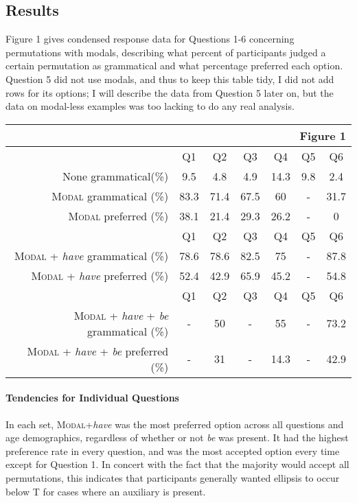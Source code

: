 \documentclass[11pt, oneside]{article}
\begin{document}
\subsection{Results}\label{Rslt}

Figure 1 gives condensed response data for Questions 1-6 concerning permutations with modals, describing what percent of participants judged a certain permutation as grammatical and what percentage preferred each option.  Question 5 did not use modals, and thus to keep this table tidy, I did not add rows for its options; I will describe the data from Question 5 later on, but the data on modal-less examples was too lacking to do any real analysis.
\small
\begin{center}
\begin{tabular}{|r|c|c|c|c|c|c|}
\multicolumn{7}{r}{Figure 1}\\
\hline\rowcolor{gblu}
	&Q1
 	&Q2
	&Q3
	&Q4
	&Q5
	&Q6\\
\hline
\hline
\rowcolor{lgr}None grammatical\footnotemark (\%) 
	&9.5 
	&4.8 
	&4.9 
	&14.3 
	&9.8
	&2.4\\
\hline\hline
\textsc{Modal} grammatical (\%) 
	&83.3
	&71.4
	&67.5
	&60
	&-
	&31.7  \\
\hline
\rowcolor{lgr}\textsc{Modal} preferred (\%)
	&38.1
	&21.4
	&29.3
	&26.2
	&-
	&0   \\
\hline\hline\rowcolor{gblu}
	&Q1
	&Q2
	&Q3
	&Q4
	&Q5
	&Q6\\
\hline\hline
\rowcolor{lgr}\textsc{Modal} + \textit{have} grammatical (\%)
	&78.6
	&78.6
	&82.5&
	75
	&-
	&87.8\\
\hline
\textsc{Modal} + \textit{have} preferred (\%)
	&52.4
	&42.9
	&65.9
	&45.2
	&-
	&54.8 \\
\hline\hline\rowcolor{gblu}
	&Q1
	&Q2
	&Q3
	&Q4
	&Q5
	&Q6\\
\hline\hline
\rowcolor{lgr}\textsc{Modal} + \textit{have} + \textit{be} grammatical (\%)
	&-
	&50
	&- 
	&55
	&- 
	&73.2\\
\hline
\textsc{Modal} + \textit{have} + \textit{be} preferred (\%) 
	&- 
	&31
	&-
	&14.3
	&-
	&42.9  \\
\hline
\end{tabular}
\end{center}
\normalsize
{}

\paragraph{Tendencies for Individual Questions}
In each set, \textsc{Modal}+\textit{have} was the most preferred option across all questions and age demographics, regardless of whether or not \textit{be} was present. It had the highest preference rate in every question, and was the most accepted option every time except for Question 1. In concert with the fact that the majority would accept all permutations, this indicates that participants generally wanted ellipsis to occur below T for cases where an auxiliary is present.
\end{document}
